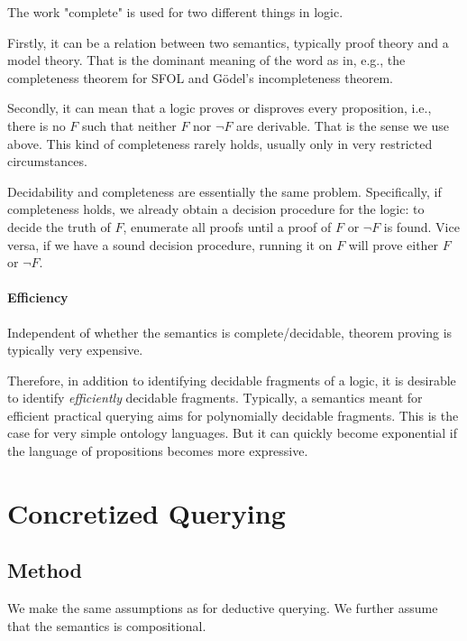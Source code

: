 \begin{remark}
The work "complete" is used for two different things in logic.

Firstly, it can be a relation between two semantics, typically proof theory and a model theory.
That is the dominant meaning of the word as in, e.g., the completeness theorem for SFOL and G\"odel's incompleteness theorem.

Secondly, it can mean that a logic proves or disproves every proposition, i.e., there is no $F$ such that neither $F$ nor $\neg F$ are derivable.
That is the sense we use above.
This kind of completeness rarely holds, usually only in very restricted circumstances.
\end{remark}

Decidability and completeness are essentially the same problem.
Specifically, if completeness holds, we already obtain a decision procedure for the logic: to decide the truth of $F$, enumerate all proofs until a proof of $F$ or $\neg F$ is found.
Vice versa, if we have a sound decision procedure, running it on $F$ will prove either $F$ or $\neg F$.

\paragraph{Efficiency}
Independent of whether the semantics is complete/decidable, theorem proving is typically very expensive.

Therefore, in addition to identifying decidable fragments of a logic, it is desirable to identify \emph{efficiently} decidable fragments.
Typically, a semantics meant for efficient practical querying aims for polynomially decidable fragments.
This is the case for very simple ontology languages.
But it can quickly become exponential if the language of propositions becomes more expressive.

\section{Concretized Querying}\label{sec:bolquery:conc}

\subsection{Method}

We make the same assumptions as for deductive querying.
We further assume that the semantics is compositional.

